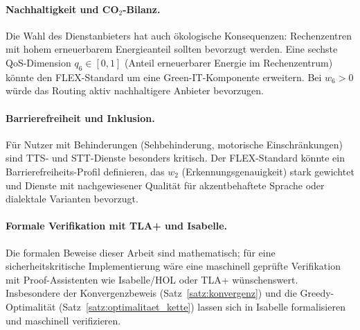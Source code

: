 ﻿\documentclass[a4paper,12pt]{article}
\theoremstyle{definition}
\begin{document}
\paragraph{Nachhaltigkeit und CO$_2$-Bilanz.}
Die Wahl des Dienstanbieters hat auch ökologische Konsequenzen: Rechenzentren mit hohem erneuerbarem Energieanteil sollten bevorzugt werden. Eine sechste QoS-Dimension $q_6 \in [0,1]$ (Anteil erneuerbarer Energie im Rechenzentrum) könnte den FLEX-Standard um eine Green-IT-Komponente erweitern. Bei $w_6 > 0$ würde das Routing aktiv nachhaltigere Anbieter bevorzugen.

\paragraph{Barrierefreiheit und Inklusion.}
Für Nutzer mit Behinderungen (Sehbehinderung, motorische Einschränkungen) sind TTS- und STT-Dienste besonders kritisch. Der FLEX-Standard könnte ein Barrierefreiheits-Profil definieren, das $w_2$ (Erkennungsgenauigkeit) stark gewichtet und Dienste mit nachgewiesener Qualität für akzentbehaftete Sprache oder dialektale Varianten bevorzugt.

\paragraph{Formale Verifikation mit TLA+ und Isabelle.}
Die formalen Beweise dieser Arbeit sind mathematisch; für eine sicherheitskritische Implementierung wäre eine maschinell geprüfte Verifikation mit Proof-Assistenten wie Isabelle/HOL \cite{nipkow2002} oder TLA+ \cite{lamport2002} wünschenswert. Insbesondere der Konvergenzbeweis (Satz~\ref{satz:konvergenz}) und die Greedy-Optimalität (Satz~\ref{satz:optimalitaet_kette}) lassen sich in Isabelle formalisieren und maschinell verifizieren.
\end{document}

